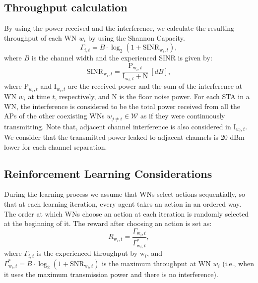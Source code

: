 \documentclass[conference]{IEEEtran}
\begin{document}
	\subsection{Throughput calculation}
	\label{section:throughput_calculation}
	
	By using the power received and the interference, we calculate the resulting throughput of each WN $w_i$ by using the Shannon Capacity.
	\begin{equation}
	\Gamma_{i,t} = B \cdot \log_{2}(1 + \text{SINR}_{\text{w}_i, t}),
	\nonumber
	\label{eq:shannon_capacity}
	\end{equation}
	where $B$ is the channel width and the experienced SINR is given by:
	\begin{equation}
	\text{SINR}_{{\text{w}_i},t} = \frac{\text{P}_{{\text{w}_i},t}}{\text{I}_{{\text{w}_i},t}+\text{N}} \: [dB],
	\label{eq:sinr}
	\end{equation}
	where $\text{P}_{{w_i},t}$ and $\text{I}_{{w_i},t}$ are the received power and the sum of the interference at WN $w_i$ at time $t$, respectively, and N is the floor noise power. For each STA in a WN, the interference is considered to be the total power received from all the APs of the other coexisting WNs $w_{j \neq i} \in \mathcal{W} $ as if they were continuously transmitting. Note that, adjacent channel interference is also considered in $\text{I}_{{w_i},t}$. We consider that the transmitted power leaked to adjacent channels is $20$ dBm lower for each channel separation.
	
	\subsection{Reinforcement Learning Considerations}
	\label{section:rl_considerations}	
	During the learning process we assume that WNs select actions sequentially, so that at each learning iteration, every agent takes an action in an ordered way. The order at which WNs choose an action at each iteration is randomly selected at the beginning of it. The reward after choosing an action is set as:
	\begin{equation}
	R_{\text{w}_i,t} = {\frac{\Gamma_{\text{w}_i,t}}{{\Gamma_{\text{w}_i,t}^*}}},
	\label{eq:reward_generation}
	\nonumber
	\end{equation}
	where $\Gamma_{i,t}$ is the experienced throughput by $\text{w}_i$, and $\Gamma_{\text{w}_i, t}^* = B \cdot \log_{2}(1 + \text{SNR}_{\text{w}_i,t})$ is the maximum throughput at WN $w_i$ (i.e., when it uses the maximum transmission power and there is no interference).	
	
\end{document}
